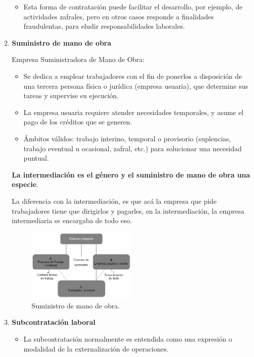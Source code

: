 \documentclass[spanish,12pt,a4paper,titlepage]{report}
\begin{document}
\begin{enumerate}
\begin{itemize}
\item Esta forma de contratación puede facilitar el desarrollo, por ejemplo, de actividades zafrales, pero en otros casos responde a finalidades fraudulentas, para eludir responsabilidades laborales.
\end{itemize}

\item \textbf{Suministro de mano de obra}

Empresa Suministradora de Mano de Obra: 
\begin{itemize}
\item Se dedica a emplear trabajadores con el fin de ponerlos a disposición de una tercera persona física o jurídica (empresa usuaria), que determine sus tareas y supervise su ejecución.
\item La empresa usuaria requiere atender necesidades temporales, y asume el pago de los créditos que se generen.
\item Ámbitos válidos: trabajo interino, temporal o provisorio (suplencias, trabajo eventual u ocasional, zafral, etc.) para solucionar una necesidad puntual.
\end{itemize}

\textbf{La intermediación es el género y el suministro de mano de obra una especie}.

La diferencia con la intermediación, es que acá la empresa que pide trabajadores tiene que dirigirlos y pagarles, en la intermediación, la empresa intermediaria se encargaba de todo eso.
  
\begin{figure}[H]
\centering
\includegraphics[width=0.5\textwidth]{rel_tri2.png}
\caption{Suministro de mano de obra.}
\end{figure}

\item \textbf{Subcontratación laboral}
\begin{itemize}
\item La subcontratación normalmente es entendida como una expresión o modalidad de la externalización de operaciones.


\end{itemize}
\end{enumerate}
\end{document}
